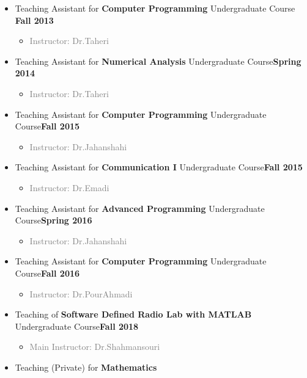 \documentclass[10pt,a4paper,sans]{moderncv} %
\begin{document}
\begin{itemize}
\item Teaching Assistant for \textbf{Computer Programming} Undergraduate Course \hfill \textbf{Fall 2013}
\begin{itemize} 
\item \textcolor{gray}{Instructor: Dr.Taheri }  \\
\end{itemize}
\item Teaching Assistant for \textbf{Numerical Analysis} Undergraduate Course\hfill \textbf{Spring 2014}
\begin{itemize} 
\item\textcolor{gray}{Instructor: Dr.Taheri}     \\
\end{itemize}
\item Teaching Assistant for \textbf{Computer Programming} Undergraduate Course\hfill \textbf{Fall 2015}
\begin{itemize} 
\item\textcolor{gray}{Instructor: Dr.Jahanshahi}   \\
\end{itemize}
\item Teaching Assistant for \textbf{Communication I} Undergraduate Course\hfill \textbf{Fall 2015}
\begin{itemize} 
\item\textcolor{gray}{Instructor: Dr.Emadi}     \\
\end{itemize}
\item Teaching Assistant for \textbf{Advanced Programming} Undergraduate Course\hfill \textbf{Spring 2016}
\begin{itemize} 
\item\textcolor{gray}{Instructor: Dr.Jahanshahi}   \\
\end{itemize}
\item Teaching Assistant for \textbf{Computer Programming} Undergraduate Course\hfill \textbf{Fall 2016}
\begin{itemize} 
\item\textcolor{gray}{Instructor: Dr.PourAhmadi}   \\
\end{itemize}
\item Teaching of \textbf{Software Defined Radio Lab with MATLAB} Undergraduate Course\hfill \textbf{Fall 2018}
\begin{itemize} 
\item\textcolor{gray}{Main Instructor: Dr.Shahmansouri}   \\
\end{itemize}
\item Teaching (Private) for \textbf{Mathematics} 
\end{itemize}
\end{document}
